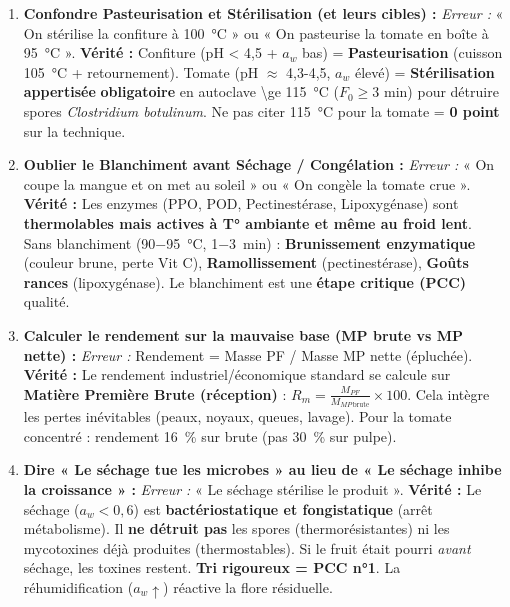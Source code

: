 \documentclass[11pt]{article}
\begin{document}
\begin{attention}
    \begin{enumerate}
        \item \textbf{Confondre Pasteurisation et Stérilisation (et leurs cibles) :} 
            \emph{Erreur :} « On stérilise la confiture à \SI{100}{\celsius} » ou « On pasteurise la tomate en boîte à \SI{95}{\celsius} ».
            \textbf{Vérité :} Confiture (pH < 4,5 + $a_w$ bas) = \textbf{Pasteurisation} (cuisson \SI{105}{\celsius} + retournement). Tomate (pH $\approx$ 4,3-4,5, $a_w$ élevé) = \textbf{Stérilisation appertisée} \textbf{obligatoire} en autoclave \SI{\ge 115}{\celsius} ($F_0 \ge 3$ min) pour détruire spores \textit{Clostridium botulinum}. Ne pas citer \SI{115}{\celsius} pour la tomate = \textbf{0 point} sur la technique.
        \item \textbf{Oublier le Blanchiment avant Séchage / Congélation :} 
            \emph{Erreur :} « On coupe la mangue et on met au soleil » ou « On congèle la tomate crue ».
            \textbf{Vérité :} Les enzymes (PPO, POD, Pectinestérase, Lipoxygénase) sont \textbf{thermolables mais actives à T° ambiante et même au froid lent}. Sans blanchiment (\SI{90-95}{\celsius}, \SI{1-3}{min}) : \textbf{Brunissement enzymatique} (couleur brune, perte Vit C), \textbf{Ramollissement} (pectinestérase), \textbf{Goûts rances} (lipoxygénase). Le blanchiment est une \textbf{étape critique (PCC)} qualité.
        \item \textbf{Calculer le rendement sur la mauvaise base (MP brute vs MP nette) :} 
            \emph{Erreur :} Rendement = Masse PF / Masse MP nette (épluchée). 
            \textbf{Vérité :} Le rendement industriel/économique standard se calcule sur \textbf{Matière Première Brute (réception)} : $R_m = \frac{M_{PF}}{M_{MP\,\text{brute}}} \times 100$. Cela intègre les pertes inévitables (peaux, noyaux, queues, lavage). Pour la tomate concentré : rendement \SI{16}{\%} sur brute (pas \SI{30}{\%} sur pulpe).
        \item \textbf{Dire « Le séchage tue les microbes » au lieu de « Le séchage inhibe la croissance » :} 
            \emph{Erreur :} « Le séchage stérilise le produit ».
            \textbf{Vérité :} Le séchage ($a_w < 0,6$) est \textbf{bactériostatique et fongistatique} (arrêt métabolisme). Il \textbf{ne détruit pas} les spores (thermorésistantes) ni les mycotoxines déjà produites (thermostables). Si le fruit était pourri \emph{avant} séchage, les toxines restent. \textbf{Tri rigoureux = PCC n°1}. La réhumidification ($a_w \uparrow$) réactive la flore résiduelle.

\end{enumerate}
\end{attention}
\end{document}
